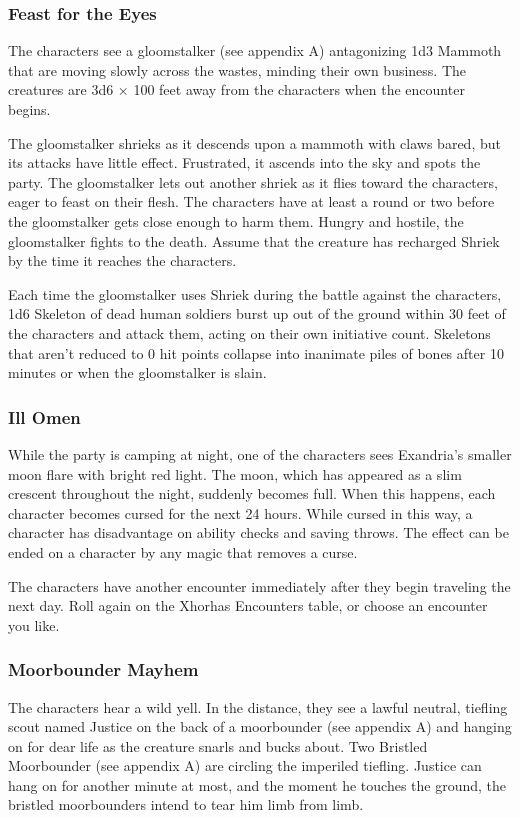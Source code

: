 \documentclass[10pt,a4paper,twoside,bg=print,twocolumn,openany,nodeprecatedcode]{dndbook}
\begin{document}
\subsubsection{Feast for the Eyes}
The characters see a gloomstalker (see appendix A) antagonizing 1d3 Mammoth that are moving slowly across the wastes, minding their own business. The creatures are 3d6 × 100 feet away from the characters when the encounter begins.

The gloomstalker shrieks as it descends upon a mammoth with claws bared, but its attacks have little effect. Frustrated, it ascends into the sky and spots the party. The gloomstalker lets out another shriek as it flies toward the characters, eager to feast on their flesh. The characters have at least a round or two before the gloomstalker gets close enough to harm them. Hungry and hostile, the gloomstalker fights to the death. Assume that the creature has recharged Shriek by the time it reaches the characters.

Each time the gloomstalker uses Shriek during the battle against the characters, 1d6 Skeleton of dead human soldiers burst up out of the ground within 30 feet of the characters and attack them, acting on their own initiative count. Skeletons that aren't reduced to 0 hit points collapse into inanimate piles of bones after 10 minutes or when the gloomstalker is slain.

\subsubsection{Ill Omen}
While the party is camping at night, one of the characters sees Exandria's smaller moon flare with bright red light. The moon, which has appeared as a slim crescent throughout the night, suddenly becomes full. When this happens, each character becomes cursed for the next 24 hours. While cursed in this way, a character has disadvantage on ability checks and saving throws. The effect can be ended on a character by any magic that removes a curse.

The characters have another encounter immediately after they begin traveling the next day. Roll again on the Xhorhas Encounters table, or choose an encounter you like.

\subsubsection{Moorbounder Mayhem}
The characters hear a wild yell. In the distance, they see a lawful neutral, tiefling scout named Justice on the back of a moorbounder (see appendix A) and hanging on for dear life as the creature snarls and bucks about. Two Bristled Moorbounder (see appendix A) are circling the imperiled tiefling. Justice can hang on for another minute at most, and the moment he touches the ground, the bristled moorbounders intend to tear him limb from limb.
\end{document}

